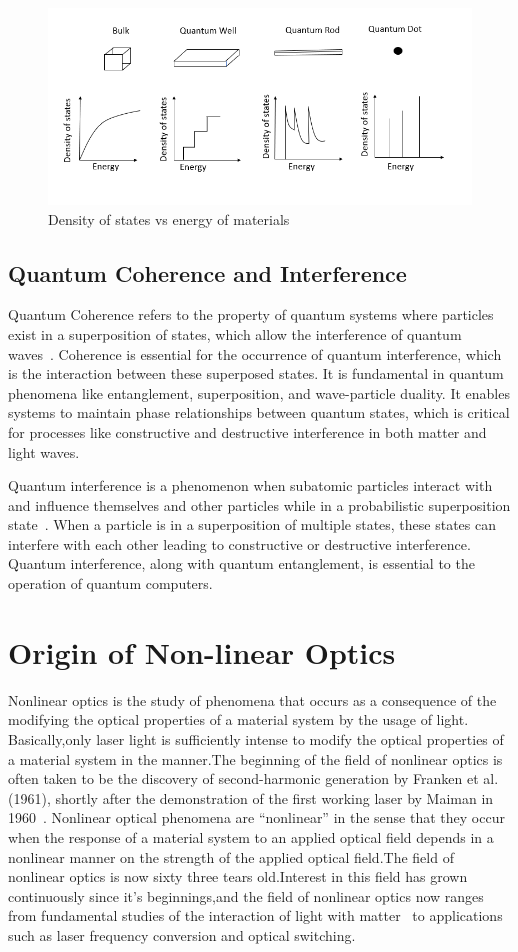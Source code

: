 \documentclass[12pt,a4paper]{article}
\begin{document}
\begin{figure}[h]
    \centering
    \includegraphics[width=0.6\linewidth]{./pictures/DoSvsE.png}
    \caption{Density of states vs energy of materials}
    \label{fig:DoS vs Energy of materials}
\end{figure}

\subsection{Quantum Coherence and Interference}
Quantum Coherence refers to the property of quantum systems where particles exist in a superposition of states, which allow the interference of quantum waves~\cite{Scully_Zubairy_1997}. Coherence is essential for the occurrence of quantum interference, which is the interaction between these superposed states. It is fundamental in quantum phenomena like entanglement, superposition, and wave-particle duality. It enables systems to maintain phase relationships between quantum states, which is critical for processes like constructive and destructive interference in both matter and light waves.\par
Quantum interference is a phenomenon when subatomic particles interact with and influence themselves and other particles while in a probabilistic superposition state~\cite{Scully_Zubairy_1997}. When a particle is in a superposition of multiple states, these states can interfere with each other leading to constructive or destructive interference. Quantum interference, along with quantum entanglement, is essential to the operation of quantum computers.

\section{Origin of Non-linear Optics}
Nonlinear optics is the study of phenomena that occurs as a consequence of the modifying the optical properties of a material system by the usage of light. Basically,only laser light is sufficiently intense to modify the optical properties of a material system in the manner.The beginning of the field of nonlinear optics is often taken to be the discovery of second-harmonic generation by Franken et al.~\cite{PhysRevLett.7.118} (1961), shortly after the demonstration of the first working laser by Maiman in 1960~\cite{laserdev}. Nonlinear optical phenomena are “nonlinear” in the sense that they occur when the response of a material system to an applied optical field depends in a nonlinear manner on the strength of the applied optical field.The field of nonlinear optics is now sixty three tears old.Interest in this field has grown continuously since it's beginnings,and the field of nonlinear optics now ranges from fundamental studies of the interaction of light with matter~\cite{lightmatter2022} to applications such as laser frequency conversion and
optical switching.
\end{document}
